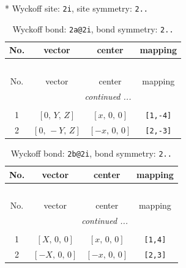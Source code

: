 \documentclass[fleqn,8pt]{jsarticle}
\begin{document}
* Wyckoff site: {\tt 2i}, site symmetry: {\tt 2..}
\renewcommand{\arraystretch}{1.2}
\begin{longtable}{cccc}
\caption{Wyckoff bond: {\tt 2a@2i}, bond symmetry: {\tt 2..}}
 \\
 \hline \hline
No. & vector & center & mapping \\ \hline \endfirsthead

\multicolumn{3}{l}{\tablename\ \thetable{}} \\
 \hline \hline
No. & vector & center & mapping \\ \hline \endhead

 \hline \hline
\multicolumn{3}{r}{\footnotesize\it continued ...} \\ \endfoot

 \hline \hline
\multicolumn{3}{r}{} \\ \endlastfoot

1 & $\left[ 0,\, Y,\, Z \right]$ & $\left[ x,\, 0,\, 0 \right]$ & {\tt [1,-4]} \\ \hline
2 & $\left[ 0,\, - Y,\, Z \right]$ & $\left[ - x,\, 0,\, 0 \right]$ & {\tt [2,-3]} \\
\end{longtable}
\renewcommand{\arraystretch}{1.2}
\begin{longtable}{cccc}
\caption{Wyckoff bond: {\tt 2b@2i}, bond symmetry: {\tt 2..}}
 \\
 \hline \hline
No. & vector & center & mapping \\ \hline \endfirsthead

\multicolumn{3}{l}{\tablename\ \thetable{}} \\
 \hline \hline
No. & vector & center & mapping \\ \hline \endhead

 \hline \hline
\multicolumn{3}{r}{\footnotesize\it continued ...} \\ \endfoot

 \hline \hline
\multicolumn{3}{r}{} \\ \endlastfoot

1 & $\left[ X,\, 0,\, 0 \right]$ & $\left[ x,\, 0,\, 0 \right]$ & {\tt [1,4]} \\ \hline
2 & $\left[ - X,\, 0,\, 0 \right]$ & $\left[ - x,\, 0,\, 0 \right]$ & {\tt [2,3]} \\
\end{longtable}
\renewcommand{\arraystretch}{1.2}
\end{document}
